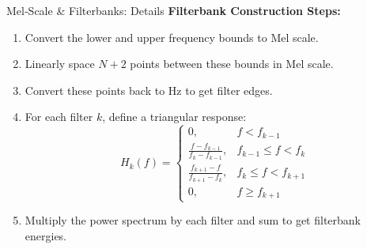 \begin{frame}[allowframebreaks]{Mel‑Scale \& Filterbanks: Details}
\framebreak
    \textbf{Filterbank Construction Steps:}
    \begin{enumerate}
        \item Convert the lower and upper frequency bounds to Mel scale.
        \item Linearly space $N+2$ points between these bounds in Mel scale.
        \item Convert these points back to Hz to get filter edges.
        \item For each filter $k$, define a triangular response:
        \begin{equation}
            H_k(f) = 
            \begin{cases}
                0, & f < f_{k-1} \\
                \frac{f - f_{k-1}}{f_k - f_{k-1}}, & f_{k-1} \leq f < f_k \\
                \frac{f_{k+1} - f}{f_{k+1} - f_k}, & f_k \leq f < f_{k+1} \\
                0, & f \geq f_{k+1}
            \end{cases}
        \end{equation}
        \item Multiply the power spectrum by each filter and sum to get filterbank energies.
    \end{enumerate}
\end{frame}